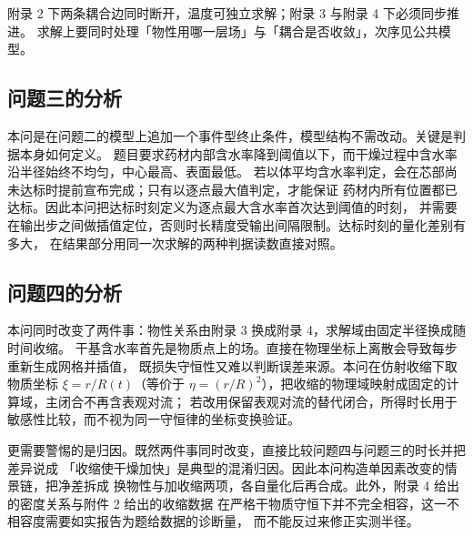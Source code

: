 附录 2 下两条耦合边同时断开，温度可独立求解；附录 3 与附录 4 下必须同步推进。
求解上要同时处理「物性用哪一层场」与「耦合是否收敛」，次序见公共模型。

\subsection{问题三的分析}

本问是在问题二的模型上追加一个事件型终止条件，模型结构不需改动。关键是判据本身如何定义。
题目要求药材内部含水率降到阈值以下，而干燥过程中含水率沿半径始终不均匀，中心最高、表面最低。
若以体平均含水率判定，会在芯部尚未达标时提前宣布完成；只有以逐点最大值判定，才能保证
药材内所有位置都已达标。因此本问把达标时刻定义为逐点最大含水率首次达到阈值的时刻，
并需要在输出步之间做插值定位，否则时长精度受输出间隔限制。达标时刻的量化差别有多大，
在结果部分用同一次求解的两种判据读数直接对照。

\subsection{问题四的分析}

本问同时改变了两件事：物性关系由附录 3 换成附录 4，求解域由固定半径换成随时间收缩。
干基含水率首先是物质点上的场。直接在物理坐标上离散会导致每步重新生成网格并插值，
既损失守恒性又难以判断误差来源。本问在仿射收缩下取物质坐标
$\xi=r/R(t)$（等价于 $\eta=(r/R)^2$），把收缩的物理域映射成固定的计算域，主闭合不再含表观对流；
若改用保留表观对流的替代闭合，所得时长用于敏感性比较，而不视为同一守恒律的坐标变换验证。

更需要警惕的是归因。既然两件事同时改变，直接比较问题四与问题三的时长并把差异说成
「收缩使干燥加快」是典型的混淆归因。因此本问构造单因素改变的情景链，把净差拆成
换物性与加收缩两项，各自量化后再合成。此外，附录 4 给出的密度关系与附件 2 给出的收缩数据
在严格干物质守恒下并不完全相容，这一不相容度需要如实报告为题给数据的诊断量，
而不能反过来修正实测半径。
